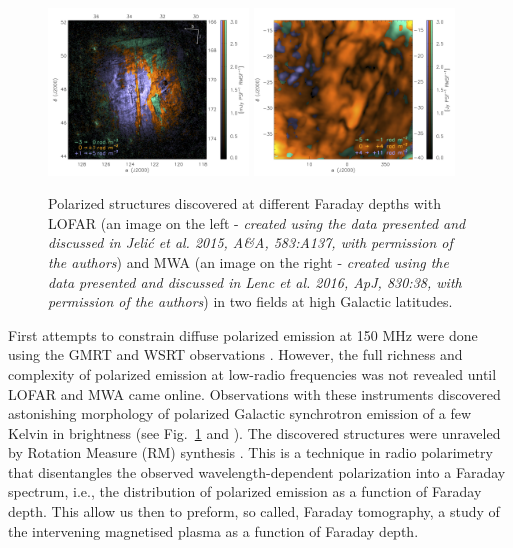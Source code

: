\begin{figure}[!t]
\centering
    \includegraphics[width=0.475\textwidth]{Chapman_Jelic/Images/3C196.png}
    \includegraphics[width=0.475\textwidth]{Chapman_Jelic/Images/lenc.png}
    \caption{Polarized structures discovered at different Faraday depths with LOFAR (an image on the left - \textit{created using the data presented and discussed in Jeli\'c et al. 2015, A\&A, 583:A137, with permission of the authors}) and MWA (an image on the right -  \textit{created using the data presented and discussed in Lenc et al. 2016, ApJ, 830:38, with permission of the authors}) in two fields at high Galactic latitudes.}
    \label{fig:polar}
\end{figure}

First attempts to constrain diffuse polarized emission at 150 MHz were done using the GMRT \cite{pen09} and WSRT observations \cite{bernardi09, bernardi10}.  However, the full richness and complexity of polarized emission at low-radio frequencies was not revealed until LOFAR and MWA came online.  Observations with these instruments discovered astonishing morphology of polarized Galactic synchrotron emission of a few Kelvin in brightness (see Fig.~\ref{fig:polar} and \cite{bernardi13, iacobelli13b, jelic14, jelic15, lenc16, lenc17, vaneck19, vaneck17}). The discovered structures were unraveled by Rotation Measure (RM) synthesis \cite{brentjens05}. This is a technique in radio polarimetry that disentangles the observed wavelength-dependent polarization into a Faraday spectrum, i.e., the distribution of polarized emission as a function of Faraday depth. This allow us then to preform, so called, Faraday tomography, a study of the intervening magnetised plasma as a function of Faraday depth.

